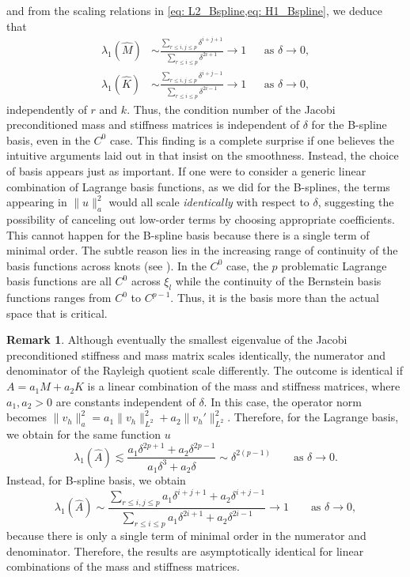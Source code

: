 \documentclass{article}
\numberwithin{equation}{section}
\theoremstyle{definition}
\newtheorem{remark}[definition]{Remark}
\begin{document}
and from the scaling relations in \cref{eq: L2_Bspline,eq: H1_Bspline}, we deduce that
\begin{align*}
    \lambda_1(\hat{M}) &\sim \frac{\sum_{r \leq i,j \leq p} \delta^{i+j+1}}{\sum_{r \leq i \leq p} \delta^{2i+1}} \to 1 & &\text{as } \delta \to 0, \\
    \lambda_1(\hat{K}) &\sim \frac{\sum_{r \leq i,j \leq p} \delta^{i+j-1}}{\sum_{r \leq i \leq p} \delta^{2i-1}} \to 1 & &\text{as } \delta \to 0,
\end{align*}
independently of $r$ and $k$. Thus, the condition number of the Jacobi preconditioned mass and stiffness matrices is independent of $\delta$ for the B-spline basis, even in the $C^0$ case. This finding is a complete surprise if one believes the intuitive arguments laid out in \cite{de2023stability} that insist on the smoothness. Instead, the choice of basis appears just as important. If one were to consider a generic linear combination of Lagrange basis functions, as we did for the B-splines, the terms appearing in $\|u\|_a^2$ would all scale \emph{identically} with respect to $\delta$, suggesting the possibility of canceling out low-order terms by choosing appropriate coefficients. This cannot happen for the B-spline basis because there is a single term of minimal order. The subtle reason lies in the increasing range of continuity of the basis functions across knots (see ). In the $C^0$ case, the $p$ problematic Lagrange basis functions are all $C^0$ across $\xi_l$ while the continuity of the Bernstein basis functions ranges from $C^0$ to $C^{p-1}$. Thus, it is the basis more than the actual space that is critical.

\begin{remark}
Although eventually the smallest eigenvalue of the Jacobi preconditioned stiffness and mass matrix scales identically, the numerator and denominator of the Rayleigh quotient scale differently. The outcome is identical if $A=a_1M+a_2K$ is a linear combination of the mass and stiffness matrices, where $a_1,a_2>0$ are constants independent of $\delta$. In this case, the operator norm becomes $\|v_h\|_a^2 = a_1 \|v_h\|_{L^2}^2+a_2 \|v_h'\|_{L^2}^2$. Therefore, for the Lagrange basis, we obtain for the same function $u$
\begin{equation*}
    \lambda_1(\hat{A}) \lesssim \frac{a_1 \delta^{2p+1}+a_2 \delta^{2p-1}}{a_1 \delta^3 + a_2 \delta} \sim \delta^{2(p-1)} \qquad \text{as } \delta \to 0.
\end{equation*}
Instead, for B-spline basis, we obtain
\begin{equation*}
    \lambda_1(\hat{A}) \sim \frac{\sum_{r \leq i,j \leq p} a_1\delta^{i+j+1}+a_2\delta^{i+j-1}}{\sum_{r \leq i \leq p} a_1\delta^{2i+1}+a_2\delta^{2i-1}} \to 1 \qquad \text{as } \delta \to 0,
\end{equation*}
because there is only a single term of minimal order in the numerator and denominator. Therefore, the results are asymptotically identical for linear combinations of the mass and stiffness matrices.
\end{remark}
\end{document}
